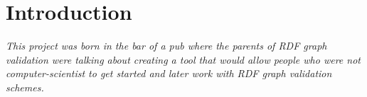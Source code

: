 \setchapterpreamble[u]{\margintoc}
\chapter{Introduction}

\textit{This project was born in the bar of a pub where the parents of RDF graph validation were talking about creating a tool that would allow people who were not computer-scientist to get started and later work with RDF graph validation schemes.}








